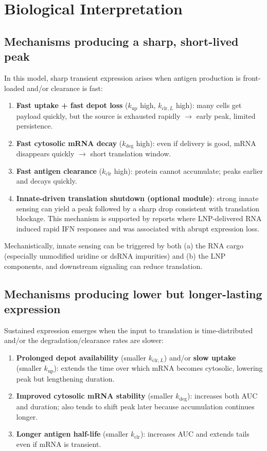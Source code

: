\section{Biological Interpretation}

\subsection*{Mechanisms producing a sharp, short-lived peak}

In this model, sharp transient expression arises when antigen production is front-loaded and/or clearance is fast:
\begin{enumerate}[label=\arabic*.]
    \item \textbf{Fast uptake + fast depot loss} ($k_{\mathrm{up}}$ high, $k_{\mathrm{clr},L}$ high): many cells get payload quickly, but the source is exhausted rapidly $\to$ early peak, limited persistence.
    \item \textbf{Fast cytosolic mRNA decay} ($k_{\mathrm{deg}}$ high): even if delivery is good, mRNA disappears quickly $\to$ short translation window.
    \item \textbf{Fast antigen clearance} ($k_{\mathrm{clr}}$ high): protein cannot accumulate; peaks earlier and decays quickly.
    \item \textbf{Innate-driven translation shutdown (optional module)}: strong innate sensing can yield a peak followed by a sharp drop consistent with translation blockage. This mechanism is supported by reports where LNP-delivered RNA induced rapid IFN responses and was associated with abrupt expression loss. \parencite{Huysmans2019saRNALNPSkin}
\end{enumerate}

Mechanistically, innate sensing can be triggered by both (a) the RNA cargo (especially unmodified uridine or dsRNA impurities) and (b) the LNP components, and downstream signaling can reduce translation. \parencite{Nelson2020mRNAChemistryInnateImmunity}

\subsection*{Mechanisms producing lower but longer-lasting expression}

Sustained expression emerges when the input to translation is time-distributed and/or the degradation/clearance rates are slower:
\begin{enumerate}[label=\arabic*.]
    \item \textbf{Prolonged depot availability} (smaller $k_{\mathrm{clr},L}$) and/or \textbf{slow uptake} (smaller $k_{\mathrm{up}}$): extends the time over which mRNA becomes cytosolic, lowering peak but lengthening duration.
    \item \textbf{Improved cytosolic mRNA stability} (smaller $k_{\mathrm{deg}}$): increases both AUC and duration; also tends to shift peak later because accumulation continues longer.
    \item \textbf{Longer antigen half-life} (smaller $k_{\mathrm{clr}}$): increases AUC and extends tails even if mRNA is transient.
\end{enumerate}

